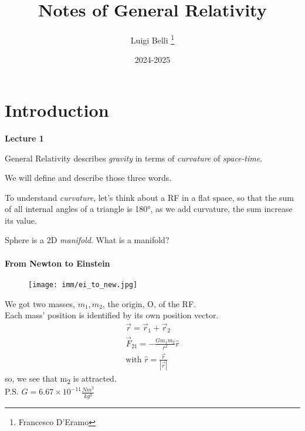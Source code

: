 \documentclass{report}
\title{Notes of  General Relativity}
\author{{Luigi Belli}
	\thanks{Francesco D'Eramo}}
\date{2024-2025}
\begin{document}
\maketitle
\tableofcontents

\chapter{Introduction}

\textbf{Lecture 1}

General Relativity describes \emph{gravity} in terms of \emph{curvature} of \emph{space-time}.

We will define and describe those three words. 

To understand \emph{curvature}, let's think about a RF in a flat space, so that the sum of all internal angles of a triangle is 180°, as we add curvature, the sum increase its value.

Sphere is a 2D \emph{manifold}. {\tiny What is a manifold?}

\subsubsection{From Newton to Einstein}

\noindent
\begin{figure}[ht]
\begin{minipage}[ht]{0.45\textwidth}
    \vspace*{0pt} 
    \texttt{[image: imm/ei\_to\_new.jpg]} 
    \vspace{12pt}
\end{minipage}
\end{figure}
\begin{minipage}[t]{0.48\textwidth}
    \vspace*{0pt} 
      We got two masses, $ m_{1}, m_{2} $, the origin, O, of the RF. \\ Each mass' position is identified by its own position vector.
	\begin{gather*}
\vec{r} = \vec{r}_{1}+\vec{r}_{2} \\
\vec{F}_{21}= - \frac{Gm_{1}m_{2}}{r^{2}} \hat{r} \\
\text{with } \hat{r} = \frac{\vec{r}}{|\vec{r}|}
	\end{gather*}
	   so, we see that m\textsubscript{2} is attracted. \\
	   P.S. $G = 6.67\times10^{-11} \frac{Nm^{2}}{kg^{2}} $
\end{minipage}
\end{document}
